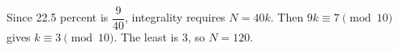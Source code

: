 Since 22.5 percent is $\dfrac{9}{40}$, integrality requires $N=40k$. Then $9k\equiv7\pmod{10}$ gives $k\equiv3\pmod{10}$. The least is 3, so $\boxed{N=120}$.
